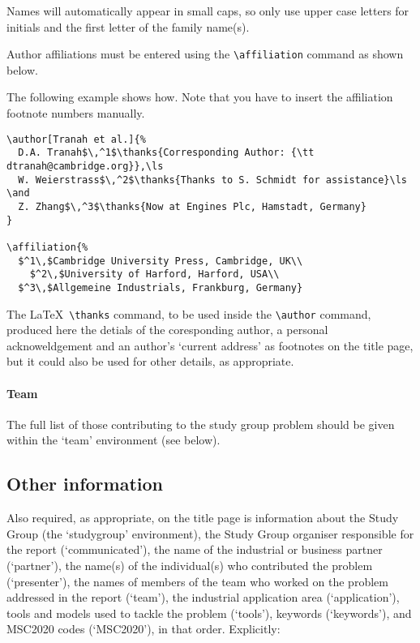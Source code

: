 \documentclass{MIIR}
\theoremstyle{plain}
\theoremstyle{definition}
\begin{document}
Names will automatically appear in small caps, so only use upper case letters for initials and the first  letter of the family name(s).

Author affiliations must be entered using
the \verb"\affiliation" command as shown below.   

The following example shows how. Note that you have to insert the affiliation footnote
numbers manually. 

%
\begin{verbatim}
\author[Tranah et al.]{%
  D.A. Tranah$\,^1$\thanks{Corresponding Author: {\tt dtranah@cambridge.org}},\ls
  W. Weierstrass$\,^2$\thanks{Thanks to S. Schmidt for assistance}\ls
\and
  Z. Zhang$\,^3$\thanks{Now at Engines Plc, Hamstadt, Germany}
}

\affiliation{%
  $^1\,$Cambridge University Press, Cambridge, UK\\
    $^2\,$University of Harford, Harford, USA\\
  $^3\,$Allgemeine Industrials, Frankburg, Germany}
  \end{verbatim}
%
The \LaTeX\ \verb"\thanks" command, to be used inside the \verb"\author" command, produced here the detials of the coresponding author, 
a personal acknoweldgement and an author's `current address'  as footnotes on the title page, but it could also be used for other details, as appropriate.

\paragraph{Team}
The full list of those contributing to the study group problem should be given within the `team' environment (see below).

\subsection{Other information}

Also required, as appropriate, on the title page is information about the Study Group (the `studygroup' environment),  the Study Group organiser responsible for the report (`communicated'), the name of the industrial or business partner (`partner'), the name(s) of the individual(s) who contributed the problem (`presenter'), the names of members of the team who worked on the problem addressed in the report (`team'), the industrial application area (`application'), tools and models used to tackle the problem (`tools'),  keywords (`keywords'), and 
MSC2020 codes (`MSC2020'), in that order.  Explicitly:
\end{document}
